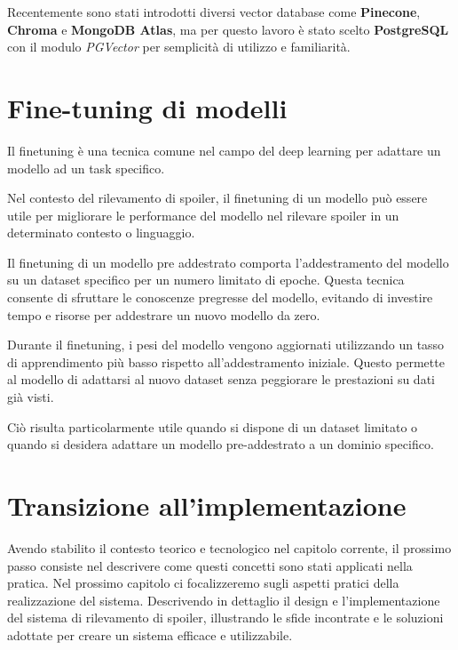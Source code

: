 Recentemente sono stati introdotti diversi vector database
come \textbf{Pinecone}, \textbf{Chroma} e \textbf{MongoDB
  Atlas}, ma per questo lavoro è stato scelto
\textbf{PostgreSQL} con il modulo \textit{PGVector} per
semplicità di utilizzo e familiarità.

\section{Fine-tuning di modelli}
\label{sec:finetuning-di-modelli}

Il finetuning è una tecnica comune nel campo del deep
learning per adattare un modello ad un task specifico.

Nel contesto del rilevamento di spoiler, il finetuning di
un modello può essere utile per migliorare le performance
del modello nel rilevare spoiler in un determinato contesto
o linguaggio.

Il finetuning di un modello pre addestrato comporta
l'addestramento del modello su un dataset specifico per un
numero limitato di epoche.
Questa tecnica consente di sfruttare le conoscenze
pregresse del modello, evitando di investire tempo e
risorse per addestrare un nuovo modello da zero.

Durante il finetuning, i pesi del modello vengono
aggiornati utilizzando un tasso di apprendimento più basso
rispetto all'addestramento iniziale.
Questo permette al modello di adattarsi al nuovo dataset
senza peggiorare le prestazioni su dati già visti.

Ciò risulta particolarmente utile quando si dispone di un
dataset limitato o quando si desidera adattare un modello
pre-addestrato a un dominio specifico.

\newpage
\section{Transizione all'implementazione}
\label{sec:transizione-implementazione}
Avendo stabilito il contesto teorico e tecnologico nel
capitolo corrente, il prossimo passo consiste nel
descrivere come questi concetti sono stati applicati nella
pratica.
Nel prossimo capitolo ci focalizzeremo sugli aspetti
pratici della realizzazione del sistema.
Descrivendo in dettaglio il design e l'implementazione del
sistema di rilevamento di spoiler, illustrando le sfide
incontrate e le soluzioni adottate per creare un sistema
efficace e utilizzabile.
